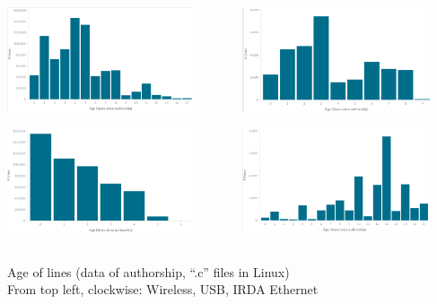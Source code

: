 \documentclass[17pt,aspectratio=169,hyperref=pdfusetitle]{beamer}
\begin{document}
\begin{frame}

\begin{columns}[T]
\begin{column}{.48\textwidth}

  \includegraphics[height=3.1cm]{figs/linux-age-net-wireless-c}

  \includegraphics[height=3.1cm]{figs/linux-age-net-ethernet-c}

\end{column}%
\hfill%
\begin{column}{.50\textwidth}

  \includegraphics[height=3.1cm]{figs/linux-age-net-usb-c}

  \includegraphics[height=3.1cm]{figs/linux-age-net-irda-c}

\end{column}%
\end{columns}
  
{\small
  Age of lines (data of authorship, ``.c'' files in Linux) \\
From top left, clockwise: Wireless, USB, IRDA Ethernet
}
\end{frame}
\end{document}

